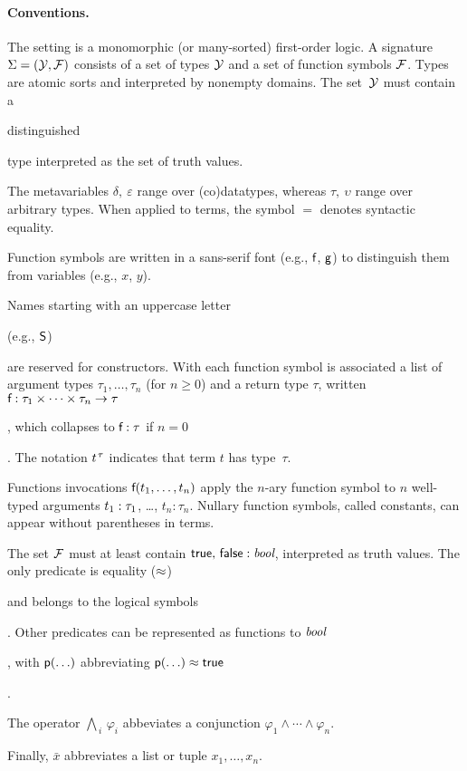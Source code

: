 \paragraph{Conventions.}
The setting is a monomorphic (or many-sorted) first-order logic.
A signature $\mathrm{\Sigma} = (\mathcal{Y}, \mathcal{F})$ consists of a set of types $\mathcal{Y}$ and a
set of function symbols $\mathcal{F}$. Types are atomic sorts and interpreted by
nonempty domains. The set~$\mathcal{Y}$ must contain a
\begin{rep}distinguished \end{rep}type  interpreted as the set of truth
values. %
\begin{rep}
The metavariables $\delta,\:\varepsilon$ range over (co)datatypes,
whereas $\tau,\:\upsilon$ range over arbitrary types.
When applied to terms, the symbol $=$ denotes syntactic equality.

Function symbols are written in a sans-serif font (e.g., $\textsf{f}$, $\textsf{g}$) to
distinguish them from variables (e.g., $x$, $y$).
\end{rep}
Names starting with an uppercase letter \begin{rep}(e.g.,
$\textsf{S}$) \end{rep}are reserved for constructors. With each function symbol 
is associated a list of argument types $\tau_1,\ldots,\tau_n$ (for $n \ge 0$)
and a return type $\tau$, written
$\textsf{f} : \tau_1 \times \cdots \times \tau_n \to \tau$\begin{rep},
which collapses to $\textsf{f} : \tau$ if $n = 0$\end{rep}.
The notation $t\typ{\tau}$ indicates that term $t$ has type~$\tau$.
\begin{rep}%
Functions invocations $\textsf{f}(t_1,\ldots,t_n)$
apply the $n$-ary function symbol
 to $n$ well-typed arguments $t_1 :\nobreak \tau_1$, \ldots, $t_n :
\tau_n$. Nullary function symbols, called constants, can appear without
parentheses in terms.
\end{rep}
The set $\mathcal{F}$ must at least contain
$\textsf{true},\, \textsf{false} : \textit{bool}$, interpreted as truth values.
The only predicate is equality ($\approx$)\begin{rep} and belongs to the logical symbols\end{rep}.
Other predicates can be represented as functions to $\textit{bool}$\begin{rep},
with $\textsf{p}(\ldots)$ abbreviating $\textsf{p}(\ldots) \approx \textsf{true}$\end{rep}.
\begin{rep}The operator $\bigwedge_{\,i}\, \varphi_i$ abbeviates a conjunction
$\varphi_1 \mathrel\land \cdots \mathrel\land \varphi_n$. \end{rep}%
Finally, $\bar x$ abbreviates a list or tuple $x_1,\ldots,x_n$.


